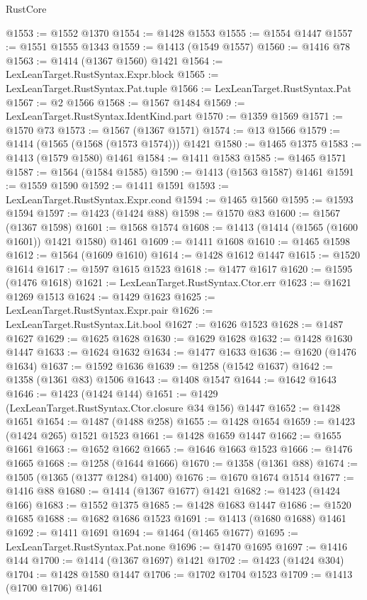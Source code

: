 \begin{lexlean}{RustCore}
\begin{coremodule}
{\begin{coremodule}
{{{{{{{{{{{{{{{{{{{{{{{{{{{{{{{{{{{{{{{{{{{{{{{@1553 := @1552 @1370
@1554 := @1428 @1553
@1555 := @1554 @1447
@1557 := @1551 @1555 @1343
@1559 := @1413 (@1549 @1557)
@1560 := @1416 @78
@1563 := @1414 (@1367 @1560) @1421
@1564 := LexLeanTarget.RustSyntax.Expr.block
@1565 := LexLeanTarget.RustSyntax.Pat.tuple
@1566 := LexLeanTarget.RustSyntax.Pat
@1567 := @2 @1566
@1568 := @1567 @1484
@1569 := LexLeanTarget.RustSyntax.IdentKind.part
@1570 := @1359 @1569
@1571 := @1570 @73
@1573 := @1567 (@1367 @1571)
@1574 := @13 @1566
@1579 := @1414 (@1565 (@1568 (@1573 @1574))) @1421
@1580 := @1465 @1375
@1583 := @1413 (@1579 @1580) @1461
@1584 := @1411 @1583
@1585 := @1465 @1571
@1587 := @1564 (@1584 @1585)
@1590 := @1413 (@1563 @1587) @1461
@1591 := @1559 @1590
@1592 := @1411 @1591
@1593 := LexLeanTarget.RustSyntax.Expr.cond
@1594 := @1465 @1560
@1595 := @1593 @1594
@1597 := @1423 (@1424 @88)
@1598 := @1570 @83
@1600 := @1567 (@1367 @1598)
@1601 := @1568 @1574
@1608 := @1413 (@1414 (@1565 (@1600 @1601)) @1421 @1580) @1461
@1609 := @1411 @1608
@1610 := @1465 @1598
@1612 := @1564 (@1609 @1610)
@1614 := @1428 @1612 @1447
@1615 := @1520 @1614
@1617 := @1597 @1615 @1523
@1618 := @1477 @1617
@1620 := @1595 (@1476 @1618)
@1621 := LexLeanTarget.RustSyntax.Ctor.err
@1623 := @1621 @1269 @1513
@1624 := @1429 @1623
@1625 := LexLeanTarget.RustSyntax.Expr.pair
@1626 := LexLeanTarget.RustSyntax.Lit.bool
@1627 := @1626 @1523
@1628 := @1487 @1627
@1629 := @1625 @1628
@1630 := @1629 @1628
@1632 := @1428 @1630 @1447
@1633 := @1624 @1632
@1634 := @1477 @1633
@1636 := @1620 (@1476 @1634)
@1637 := @1592 @1636
@1639 := @1258 (@1542 @1637)
@1642 := @1358 (@1361 @83) @1506
@1643 := @1408 @1547
@1644 := @1642 @1643
@1646 := @1423 (@1424 @144)
@1651 := @1429 (LexLeanTarget.RustSyntax.Ctor.closure @34 @156) @1447
@1652 := @1428 @1651
@1654 := @1487 (@1488 @258)
@1655 := @1428 @1654
@1659 := @1423 (@1424 @265) @1521 @1523
@1661 := @1428 @1659 @1447
@1662 := @1655 @1661
@1663 := @1652 @1662
@1665 := @1646 @1663 @1523
@1666 := @1476 @1665
@1668 := @1258 (@1644 @1666)
@1670 := @1358 (@1361 @88)
@1674 := @1505 (@1365 (@1377 @1284) @1400)
@1676 := @1670 @1674 @1514
@1677 := @1416 @88
@1680 := @1414 (@1367 @1677) @1421
@1682 := @1423 (@1424 @166)
@1683 := @1552 @1375
@1685 := @1428 @1683 @1447
@1686 := @1520 @1685
@1688 := @1682 @1686 @1523
@1691 := @1413 (@1680 @1688) @1461
@1692 := @1411 @1691
@1694 := @1464 (@1465 @1677)
@1695 := LexLeanTarget.RustSyntax.Pat.none
@1696 := @1470 @1695
@1697 := @1416 @144
@1700 := @1414 (@1367 @1697) @1421
@1702 := @1423 (@1424 @304)
@1704 := @1428 @1580 @1447
@1706 := @1702 @1704 @1523
@1709 := @1413 (@1700 @1706) @1461
}}}}}}}}}}}}}}}}}}}}}}}}}}}}}}}}}}}}}}}}}}}}}}}
\end{coremodule}}
\end{coremodule}
\end{lexlean}
